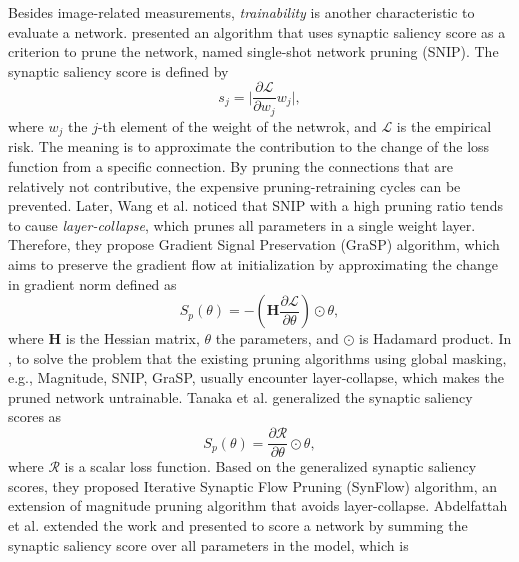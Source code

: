 \documentclass[sigconf]{acmart}
\begin{document}
    Besides image-related measurements, \textit{trainability} is another characteristic to 
    evaluate a network. 
    \cite{lee2019snip} presented an algorithm that uses synaptic saliency score as a 
    criterion to prune the network, named single-shot network pruning (SNIP). 
    The synaptic saliency score is defined by 
    \begin{equation}
        \label{equ:snip_connection_sensitivity}
        s_j=\lvert \frac{\partial \mathcal L}{\partial w_j}w_j\rvert,
    \end{equation}
    where $w_j$ the $j$-th element of the weight of the netwrok, and $\mathcal L$ is 
    the empirical risk. The meaning is to approximate the contribution 
    to the change of the loss function from a specific connection. By pruning the 
    connections that are relatively not contributive, the expensive pruning-retraining 
    cycles can be prevented. 
    Later, Wang et al. \cite{wang2020picking} noticed that SNIP with a high pruning ratio 
    tends to cause \textit{layer-collapse}, which prunes all parameters in a single weight 
    layer. Therefore, they propose Gradient Signal Preservation (GraSP) algorithm, which 
    aims to preserve the gradient flow at initialization by approximating the change in 
    gradient norm defined as 
    \begin{equation}
        \label{equ:grap}
        S_p(\theta)=-(\textbf{H}\frac{\partial \mathcal L}{\partial \theta})\odot\theta,
    \end{equation}
    where $\textbf{H}$ is the Hessian matrix, $\theta$ the parameters, and $\odot$ is Hadamard product. 
    In \cite{tanaka2020pruning}, to solve the problem that the existing pruning algorithms using 
    global masking, e.g., Magnitude, SNIP, GraSP, usually encounter layer-collapse, which makes 
    the pruned network untrainable. 
    Tanaka et al. generalized the synaptic saliency scores as 
    \begin{equation}
        \label{equ:synflow}
        S_p(\theta)=\frac{\partial \mathcal R}{\partial \theta}\odot\theta,
    \end{equation}
    where $\mathcal R$ is a scalar loss function. Based on the generalized synaptic saliency scores, 
    they proposed Iterative Synaptic Flow Pruning (SynFlow) algorithm, an extension of magnitude 
    pruning algorithm that avoids layer-collapse. 
    Abdelfattah et al. \cite{abdelfattah2021zerocost} extended the work and presented to score a 
    network by summing the synaptic saliency score over all parameters in the model, which is 
\end{document}
